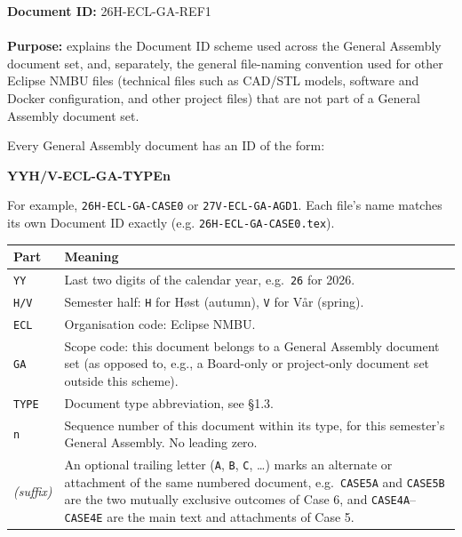\documentclass{../../../Common/Latex/Templates/rapport}
\date{\meetingdate, \meetingtime}
\begin{document}
\makecoverpage
\tableofcontents
\reportmainmatter

\noindent\textbf{Document ID:} 26H-ECL-GA-REF1\\
\meetingline\\
\textbf{Purpose:} explains the Document ID scheme used across the General Assembly document set, and, separately, the general file-naming convention used for other Eclipse NMBU files (technical files such as CAD/STL models, software and Docker configuration, and other project files) that are not part of a General Assembly document set.


Every General Assembly document has an ID of the form:
\begin{center}
  \bfseries YYH/V-ECL-GA-TYPEn
\end{center}
For example, \texttt{26H-ECL-GA-CASE0} or \texttt{27V-ECL-GA-AGD1}. Each file's name matches its own Document ID exactly (e.g. \texttt{26H-ECL-GA-CASE0.tex}).

\begin{longtable}{|L{2.3cm}|L{11cm}|}
  \hline
  \textbf{Part} & \textbf{Meaning} \\
  \hline
  \endhead
  \texttt{YY}   & Last two digits of the calendar year, e.g.\ \texttt{26} for 2026. \\
  \hline
  \texttt{H/V}  & Semester half: \texttt{H} for Høst (autumn), \texttt{V} for Vår (spring). \\
  \hline
  \texttt{ECL}  & Organisation code: Eclipse NMBU. \\
  \hline
  \texttt{GA}   & Scope code: this document belongs to a General Assembly document set (as opposed to, e.g., a Board-only or project-only document set outside this scheme). \\
  \hline
  \texttt{TYPE} & Document type abbreviation, see \S1.3. \\
  \hline
  \texttt{n}    & Sequence number of this document within its type, for this semester's General Assembly. No leading zero. \\
  \hline
  \emph{(suffix)} & An optional trailing letter (\texttt{A}, \texttt{B}, \texttt{C}, \ldots) marks an alternate or attachment of the same numbered document, e.g.\ \texttt{CASE5A} and \texttt{CASE5B} are the two mutually exclusive outcomes of Case 6, and \texttt{CASE4A}--\texttt{CASE4E} are the main text and attachments of Case 5. \\
  \hline
\end{longtable}
\end{document}
